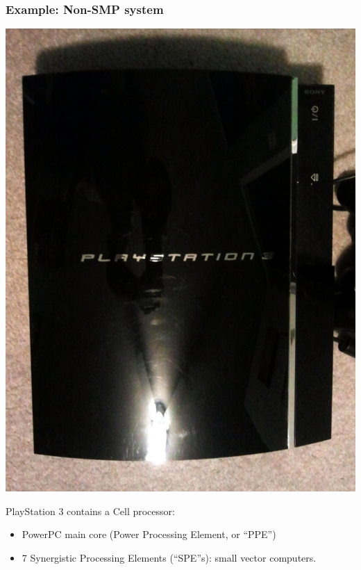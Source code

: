 \documentclass[aspectratio=43]{beamer}
\begin{document}
\begin{frame}
  \frametitle{Example: Non-SMP system}

\begin{center}
  \includegraphics[height=.5\textheight]{L03/ps3-small}
\end{center}

  PlayStation 3 contains a Cell processor:
  \begin{itemize}
    \item PowerPC main core (Power Processing Element, or ``PPE'')
    \item 7 Synergistic Processing Elements (``SPE''s): small vector computers.
  \end{itemize}
\end{frame}
\end{document}

